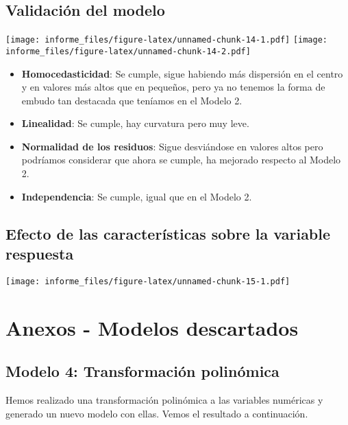 \documentclass[
]{article}
\providecommand{\tightlist}{%
  \setlength{\itemsep}{0pt}\setlength{\parskip}{0pt}}
\begin{document}
\hypertarget{validaciuxf3n-del-modelo}{%
\subsection{Validación del modelo}\label{validaciuxf3n-del-modelo}}

\texttt{[image: informe\_files/figure-latex/unnamed-chunk-14-1.pdf]}
\texttt{[image: informe\_files/figure-latex/unnamed-chunk-14-2.pdf]}

\begin{itemize}
\tightlist
\item
  \textbf{Homocedasticidad}: Se cumple, sigue habiendo más dispersión en
  el centro y en valores más altos que en pequeños, pero ya no tenemos
  la forma de embudo tan destacada que teníamos en el Modelo 2.
\item
  \textbf{Linealidad}: Se cumple, hay curvatura pero muy leve.
\item
  \textbf{Normalidad de los residuos}: Sigue desviándose en valores
  altos pero podríamos considerar que ahora se cumple, ha mejorado
  respecto al Modelo 2.
\item
  \textbf{Independencia}: Se cumple, igual que en el Modelo 2.
\end{itemize}

\hypertarget{efecto-de-las-caracteruxedsticas-sobre-la-variable-respuesta}{%
\subsection{Efecto de las características sobre la variable
respuesta}\label{efecto-de-las-caracteruxedsticas-sobre-la-variable-respuesta}}

\texttt{[image: informe\_files/figure-latex/unnamed-chunk-15-1.pdf]}

\newpage

\hypertarget{anexos---modelos-descartados}{%
\section{Anexos - Modelos
descartados}\label{anexos---modelos-descartados}}

\hypertarget{modelo-4-transformaciuxf3n-polinuxf3mica}{%
\subsection{Modelo 4: Transformación
polinómica}\label{modelo-4-transformaciuxf3n-polinuxf3mica}}

Hemos realizado una transformación polinómica a las variables numéricas
y generado un nuevo modelo con ellas. Vemos el resultado a continuación.
\end{document}
